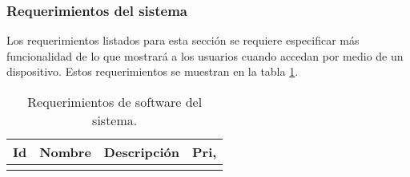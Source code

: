 %

\subsubsection{Requerimientos del sistema}

Los requerimientos listados para esta sección se requiere especificar más 
funcionalidad de lo que mostrará a los usuarios cuando accedan por medio de un 
dispositivo. Estos requerimientos se muestran en la tabla 
\ref{tab:req:soft:sistema}.

\begin{longtable}[c]{| l | l | p{6.5cm} | c |}
	\caption{Requerimientos de software del sistema. 
	\label{tab:req:soft:sistema}} \\
	\hline
	\textbf{Id} & \textbf{Nombre} & \textbf{Descripción} & 
	\textbf{Pri,}\\
	\hline
	\endfirsthead

	\hline
	\endhead

	\hline
	\endfoot

	\hline
	\endlastfoot
 

\end{longtable}
